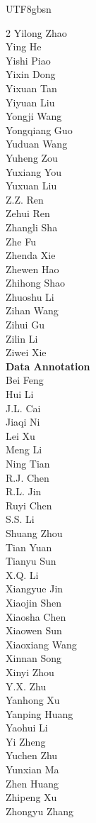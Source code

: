 \documentclass[11pt, a4paper, logo, copyright, nonumbering]{deepseek}
\begin{document}
\begin{CJK*}{UTF8}{gbsn}
\begin{multicols}{2}
Yilong Zhao \\
Ying He \\
Yishi Piao \\
Yixin Dong \\
Yixuan Tan \\
Yiyuan Liu \\
Yongji Wang \\
Yongqiang Guo \\
Yuduan Wang \\
Yuheng Zou \\
Yuxiang You \\
Yuxuan Liu \\
Z.Z. Ren \\
Zehui Ren \\
Zhangli Sha \\
Zhe Fu \\
Zhenda Xie \\
Zhewen Hao \\
Zhihong Shao \\
Zhuoshu Li \\
Zihan Wang \\
Zihui Gu \\
Zilin Li \\
Ziwei Xie \\

\noindent
\textbf{Data Annotation} \\
Bei Feng  \\
Hui Li  \\
J.L. Cai  \\
Jiaqi Ni  \\
Lei Xu  \\
Meng Li  \\
Ning Tian  \\
R.J. Chen  \\
R.L. Jin  \\
Ruyi Chen  \\
S.S. Li  \\
Shuang Zhou  \\
Tian Yuan  \\
Tianyu Sun  \\
X.Q. Li  \\
Xiangyue Jin  \\
Xiaojin Shen  \\
Xiaosha Chen  \\
Xiaowen Sun  \\
Xiaoxiang Wang  \\
Xinnan Song  \\
Xinyi Zhou  \\
Y.X. Zhu  \\
Yanhong Xu  \\
Yanping Huang  \\
Yaohui Li  \\
Yi Zheng  \\
Yuchen Zhu  \\
Yunxian Ma  \\
Zhen Huang  \\
Zhipeng Xu  \\
Zhongyu Zhang  \\


\end{multicols}
\end{CJK*}
\end{document}
